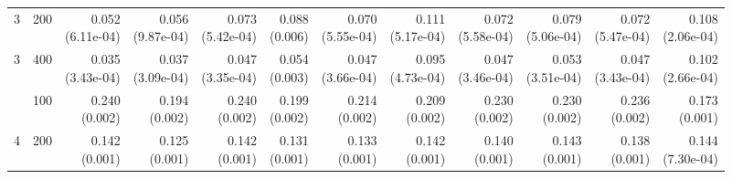 \begin{table}[p]
{\begin{tabular}{llrrrrrrrrrr}
3 & 200 & \shortstack{0.052\\(6.11e-04)} & \shortstack{0.056\\(9.87e-04)} & \shortstack{0.073\\(5.42e-04)} & \shortstack{0.088\\(0.006)} & \shortstack{0.070\\(5.55e-04)} & \shortstack{0.111\\(5.17e-04)} & \shortstack{0.072\\(5.58e-04)} & \shortstack{0.079\\(5.06e-04)} & \shortstack{0.072\\(5.47e-04)} & \shortstack{0.108\\(2.06e-04)} \\
3 & 400 & \shortstack{0.035\\(3.43e-04)} & \shortstack{0.037\\(3.09e-04)} & \shortstack{0.047\\(3.35e-04)} & \shortstack{0.054\\(0.003)} & \shortstack{0.047\\(3.66e-04)} & \shortstack{0.095\\(4.73e-04)} & \shortstack{0.047\\(3.46e-04)} & \shortstack{0.053\\(3.51e-04)} & \shortstack{0.047\\(3.43e-04)} & \shortstack{0.102\\(2.66e-04)} \\
\addlinespace
4 & 100 & \shortstack{0.240\\(0.002)} & \shortstack{0.194\\(0.002)} & \shortstack{0.240\\(0.002)} & \shortstack{0.199\\(0.002)} & \shortstack{0.214\\(0.002)} & \shortstack{0.209\\(0.002)} & \shortstack{0.230\\(0.002)} & \shortstack{0.230\\(0.002)} & \shortstack{0.236\\(0.002)} & \shortstack{0.173\\(0.001)} \\
4 & 200 & \shortstack{0.142\\(0.001)} & \shortstack{0.125\\(0.001)} & \shortstack{0.142\\(0.001)} & \shortstack{0.131\\(0.001)} & \shortstack{0.133\\(0.001)} & \shortstack{0.142\\(0.001)} & \shortstack{0.140\\(0.001)} & \shortstack{0.143\\(0.001)} & \shortstack{0.138\\(0.001)} & \shortstack{0.144\\(7.30e-04)} \\

\end{tabular}}
\end{table}
